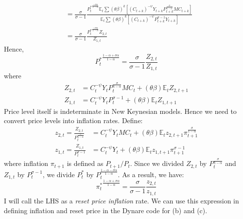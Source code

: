 \documentclass[11pt]{amsart}
\begin{document}
\begin{enumerate}[label = (\alph*)]
\begin{align*}
	& =  \frac{\sigma}{\sigma - 1}\frac{ {P_t^*}^{\frac{-\sigma \alpha}{1-\alpha}} \mathbb{ E }_t \sum (\theta \beta)^k \left[ \left( C_{t+k}\right)^{-\psi}  Y_{t+k} P_{t+k}^{\frac{\sigma}{1-\alpha}}    MC_{t+k}  \right]} {\mathbb{ E }_t \sum (\theta \beta)^k  \left[ \left( C_{t+k}\right)^{-\psi} P_{t+k}^{\sigma-1} Y_{t+k}  \right]} \\
	& = \frac{\sigma}{\sigma - 1} \frac{{P_t^*}^{\frac{-\sigma \alpha}{1-\alpha}} Z_{2,t}}{Z_{1,t}}
	\end{align*}
	Hence, 
	\begin{equation*}
	{P_t^*}^{\frac{1-\alpha + \sigma \alpha}{1- \alpha}} = \frac{\sigma}{\sigma -1} \frac{Z_{2,t}}{Z_{1,t}}
	\end{equation*}
	where 
	\begin{align*}
	Z_{2,t} &= C_t^{-\psi} Y_t P_t^{\frac{\sigma}{1-\alpha}} MC_t + (\theta \beta) \mathbb{ E }_t Z_{2,t+1} \\
	Z_{1,t} & = C_t^{-\psi} Y_t P_t^{\sigma-1} + (\theta \beta) \mathbb{ E }_t Z_{1,t+1}
	\end{align*}
	Price level itself is indeterminate in New Keynesian models. Hence we need to convert price levels into inflation rates. Define: 
	\begin{align*}
	z_{2,t} = \frac{Z_{2,t}}{P_t^{\frac{\sigma}{1-\alpha}}} &= C_t^{-\psi} Y_t  MC_t + (\theta \beta) \mathbb{ E }_t z_{2,t+1} \pi_{t+1}^{\frac{\sigma}{1-\alpha}} \\
	z_{1,t} = \frac{Z_{1,t}}{P_t^{\sigma-1}} & = C_t^{-\psi} Y_t  + (\theta \beta) \mathbb{ E }_t z_{1,t+1} \pi_{t+1}^{\sigma-1}
	\end{align*}
	where inflation $\pi_{t+1}$ is defined as $P_{t+1}/{P_t}$. Since we divided $Z_{2,t}$ by $P_t^{\frac{\sigma}{1-\alpha}}$ and $Z_{1,t}$ by $P_t^{\sigma-1}$, we divide $P_t^*$ by $P_t^{\frac{1-\alpha-\sigma \alpha}{1-\alpha}}$. As a result, we have:
	\begin{equation*}
	{\pi_t^*}^{\frac{1-\alpha + \sigma \alpha}{1-\alpha}} = \frac{\sigma}{\sigma -1} \frac{z_{2,t}}{z_{1,t}}
	\end{equation*}
	I will call the LHS as a \textit{reset price inflation} rate. 
	We can use this expression in defining inflation and reset price in the Dynare code for (b) and (c).
	

\end{enumerate}
\end{document}

